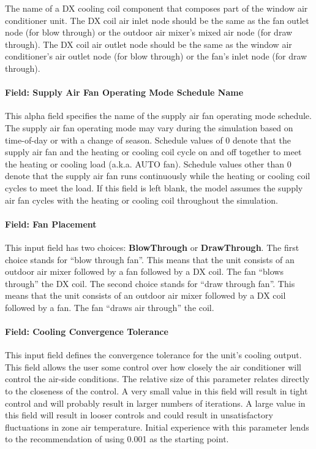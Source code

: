 The name of a DX cooling coil component that composes part of the window air conditioner unit. The DX coil air inlet node should be the same as the fan outlet node (for blow through) or the outdoor air mixer's mixed air node (for draw through). The DX coil air outlet node should be the same as the window air conditioner's air outlet node (for blow through) or the fan's inlet node (for draw through).

\paragraph{Field: Supply Air Fan Operating Mode Schedule Name}\label{field-supply-air-fan-operating-mode-schedule-name-3-000}

This alpha field specifies the name of the supply air fan operating mode schedule. The supply air fan operating mode may vary during the simulation based on time-of-day or with a change of season. Schedule values of 0 denote that the supply air fan and the heating or cooling coil cycle on and off together to meet the heating or cooling load (a.k.a. AUTO fan). Schedule values other than 0 denote that the supply air fan runs continuously while the heating or cooling coil cycles to meet the load. If this field is left blank, the model assumes the supply air fan cycles with the heating or cooling coil throughout the simulation.

\paragraph{Field: Fan Placement}\label{field-fan-placement-2-000}

This input field has two choices: \textbf{BlowThrough} or \textbf{DrawThrough}. The first choice stands for ``blow through fan''. This means that the unit consists of an outdoor air mixer followed by a fan followed by a DX coil. The fan ``blows through'' the DX coil. The second choice stands for ``draw through fan''. This means that the unit consists of an outdoor air mixer followed by a DX coil followed by a fan. The fan ``draws air through'' the coil.

\paragraph{Field: Cooling Convergence Tolerance}\label{field-cooling-convergence-tolerance-2}

This input field defines the convergence tolerance for the unit's cooling output. This field allows the user some control over how closely the air conditioner will control the air-side conditions. The relative size of this parameter relates directly to the closeness of the control. A very small value in this field will result in tight control and will probably result in larger numbers of iterations. A large value in this field will result in looser controls and could result in unsatisfactory fluctuations in zone air temperature. Initial experience with this parameter lends to the recommendation of using 0.001 as the starting point.

